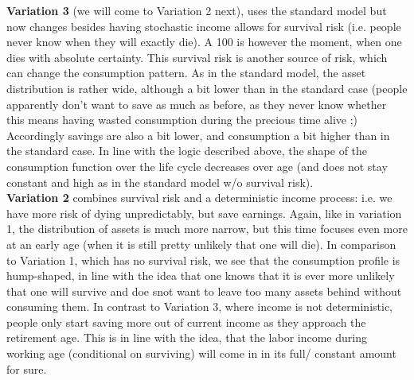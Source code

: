 \documentclass[12pt,a4paper]{article}
\begin{document}
\textbf{Variation 3} (we will come to Variation 2 next), uses the standard model but now changes besides having stochastic income allows for survival risk (i.e. people never know when they will exactly die). A 100 is however the moment, when one dies with absolute certainty. This survival risk is another source of risk, which can change the consumption pattern. As in the standard model, the asset distribution is rather wide, although a bit lower than in the standard case (people apparently don't want to save as much as before, as they never know whether this means having wasted consumption during the precious time alive ;) Accordingly savings are also a bit lower, and consumption a bit higher than in the standard case. In line with the logic described above, the shape of the consumption function over the life cycle decreases over age (and does not stay constant and high as in the standard model w/o survival risk). \\

\textbf{Variation 2} combines survival risk and a deterministic income process: i.e. we have more risk of dying unpredictably, but save earnings. Again, like in variation 1, the distribution of assets is much more narrow, but this time focuses even more at an early age (when it is still pretty unlikely that one will die).  In comparison to Variation 1, which has no survival risk, we see that the consumption profile is hump-shaped, in line with the idea that one knows that it is ever more unlikely that one will survive and doe snot want to leave too many assets behind without consuming them. In contrast to Variation 3, where income is not deterministic, people only start saving more out of current income as they approach the retirement age. This is in line with the idea, that the labor income during working age (conditional on surviving) will come in in its full/ constant amount for sure.
\end{document}
